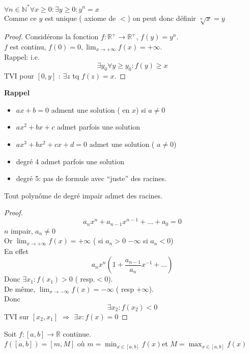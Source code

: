 \documentclass[../main.tex]{subfiles}
\begin{document}

\begin{crly}
$\forall n \in \mathbb{N}^{*} \forall x \geq 0: \exists y \geq 0: y^{n}=x$\\
Comme ce $y$ est unique ( axiome de $<$) on peut donc définir $\sqrt[n] { x} = y $
\end{crly}
\begin{proof}
	Considérons la fonction $f: \mathbb{R}^{+} \to \mathbb{R}^{+}$, $f( y) = y^{n}$.\\
	$f$ est continu, $f( 0) = 0, \lim_{x \to  + \infty} f( x) = + \infty $.\\
	Rappel: i.e.
	\[ 
		\exists y_0 \forall y \geq y_0: f( y) \geq x
	\]
	TVI pour $ [ 0, y] $ : $\exists z $ tq $f( z) = x$.
\end{proof}
\begin{flushleft}
\textbf{Rappel}
\end{flushleft}
\begin{itemize}
\item $ax+b = 0$ adment une solution ( en $x$) si $a\neq 0$ 
\item $ax^{2} + bx + c$ admet parfois une solution
\item $ax^{3}+ bx^{2} + cx + d= 0$ admet une solution ( $a\neq 0$) 
\item degré 4 admet parfois une solution
\item degré 5: pas de formule avec ``juste'' des racines.
\end{itemize}
\begin{crly}
Tout polynôme de degré impair admet des racines.
\end{crly}
\begin{proof}
\[ 
a_n x^{n} + a_{n-1} x^{n-1} + \ldots + a_0 = 0
\]
$n$ impair, $a_n \neq 0$ \\
Or $ \lim_{x \to  + \infty} f( x) = + \infty $ ( si $a_n > 0$ $- \infty $ si $a_n < 0$) \\
En effet
\[ 
	a_n x^{n} ( 1 + \frac{a_{n-1} }{a_n} x^{-1} + \ldots ) 
\]
Donc $\exists x_1: f( x_1) > 0$ ( resp.$< 0$).\\
De même, $\lim_{x \to - \infty  } f( x) = - \infty $ ( resp $+ \infty $).\\
Donc
\[ 
	\exists x_2: f( x_2) < 0
\]
TVI sur $[x_2, x_1]$ $\Rightarrow$ $\exists x: f( x) = 0$

\end{proof}
\begin{crly}
Soit $f: [ a,b] \to \mathbb{R}$ continue.\\
$f( [ a,b ]) = [ m, M]  $ où $m = \min_{x \in [ a,b] } f( x)  $et $ M = \max_{x\in [ a,b] } f( x) $
\end{crly}
\end{document}
